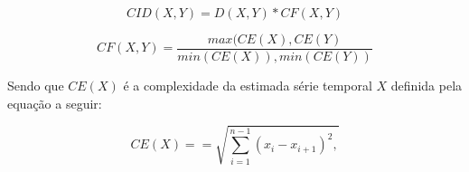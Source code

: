\begin{equation}\label{eqCID}
CID(X,Y)= D(X,Y)*CF(X,Y)
\end{equation}

\begin{equation}\label{eqfc}
CF(X,Y)= \frac{max(CE(X),CE(Y)}{min(CE(X)),min(CE(Y))}
\end{equation}

Sendo que $CE(X)$ é a complexidade da estimada série temporal $X$ definida pela equação a seguir: 

\begin{equation}\label{eqce}
CE(X)= =\sqrt{ \sum_{i=1}^{n-1} (x_i - x_{i+1})^2,} 
\end{equation}







